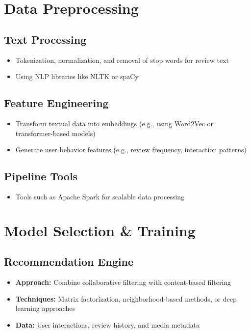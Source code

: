 \documentclass[11pt]{article}
\begin{document}
\section{Data Preprocessing}
\subsection*{Text Processing}
\begin{itemize}[noitemsep]
    \item Tokenization, normalization, and removal of stop words for review text
    \item Using NLP libraries like NLTK or spaCy
\end{itemize}

\subsection*{Feature Engineering}
\begin{itemize}[noitemsep]
    \item Transform textual data into embeddings (e.g., using Word2Vec or transformer-based models)
    \item Generate user behavior features (e.g., review frequency, interaction patterns)
\end{itemize}

\subsection*{Pipeline Tools}
\begin{itemize}[noitemsep]
    \item Tools such as Apache Spark for scalable data processing
\end{itemize}

\section{Model Selection \& Training}
\subsection*{Recommendation Engine}
\begin{itemize}[noitemsep]
    \item \textbf{Approach:} Combine collaborative filtering with content-based filtering
    \item \textbf{Techniques:} Matrix factorization, neighborhood-based methods, or deep learning approaches
    \item \textbf{Data:} User interactions, review history, and media metadata
\end{itemize}
\end{document}
